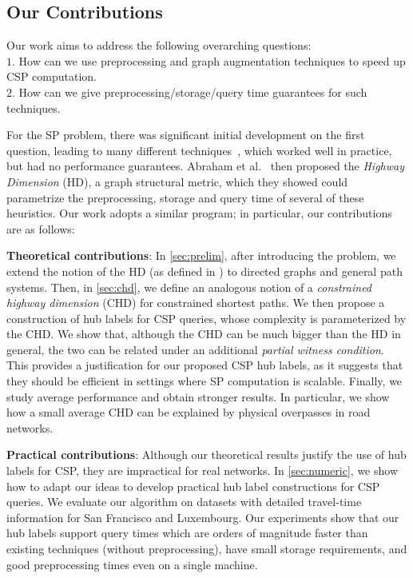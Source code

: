 \subsection{Our Contributions}

Our work aims to address the following overarching questions:\\
\noindent $1.$ How can we use preprocessing and graph augmentation techniques to speed up CSP computation. \\
\noindent $2.$ How can we give preprocessing/storage/query time guarantees for such techniques.

For the SP problem, there was significant initial development on the first question, leading to many different techniques~\cite{dimacs09}, which worked well in practice, but had no performance guarantees.
Abraham et al.~\cite{highway2013, highway2010} then proposed the \emph{Highway Dimension} (HD), a graph structural metric, which they showed could parametrize the preprocessing, storage and query time of several of these heuristics.
Our work adopts a similar program; in particular, our contributions are as follows:

\textbf{Theoretical contributions}: 
In \cref{sec:prelim}, after introducing the problem, we extend the notion of the HD (as defined in \cite{highway2013}) to directed graphs and general path systems. Then, in \cref{sec:chd}, we define an analogous notion of a \emph{constrained highway dimension} (CHD) for constrained shortest paths. 
We then propose a construction of hub labels for CSP queries, whose complexity is parameterized by the CHD. 
We show that, although the CHD can be much bigger than the HD in general, the two can be related under an additional \emph{partial witness condition}. 
This provides a justification for our proposed CSP hub labels, as it suggests that they should be efficient in settings where SP computation is scalable.
Finally, we study average performance and obtain stronger results. 
In particular, we show how a small average CHD can be explained by physical overpasses in road networks.

\textbf{Practical contributions}: 
Although our theoretical results justify the use of hub labels for CSP, they are impractical for real networks. 
In \cref{sec:numeric}, we show how to adapt our ideas to develop practical hub label constructions for CSP queries. 
We evaluate our algorithm on datasets with detailed travel-time information for San Francisco and Luxembourg.
Our experiments show that our hub labels support query times which are orders of magnitude faster than existing techniques (without preprocessing), have small storage requirements, and good preprocessing times even on a single machine. 


